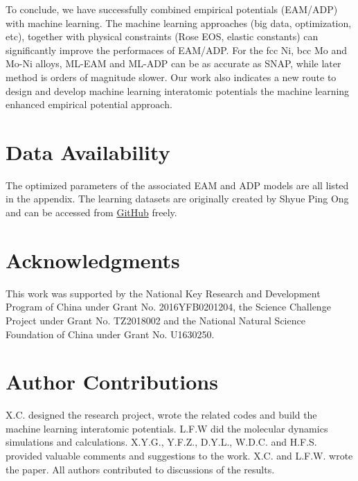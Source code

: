 \documentclass[prb,reprint,superscriptaddress]{revtex4-2}
\begin{document}
To conclude, we have successfully combined empirical potentials (EAM/ADP) with 
machine learning. The machine learning approaches (big data, optimization, etc), 
together with physical constraints (Rose EOS, elastic constants) can 
significantly improve the performaces of EAM/ADP. For the fcc Ni, bcc Mo and 
Mo-Ni alloys, ML-EAM and ML-ADP can be as accurate as SNAP, while later method 
is orders of magnitude slower. Our work also indicates a new route to design and 
develop machine learning interatomic potentials \textemdash the machine learning 
enhanced empirical potential approach.

% 
%
\section*{Data Availability}
The optimized parameters of the associated EAM and ADP models are all listed in 
the appendix. The learning datasets are originally created by Shyue Ping Ong 
and can be accessed from 
\href{https://github.com/materialsvirtuallab/snap}{GitHub} freely.

% 
%
\section*{Acknowledgments}
\label{sec:acknowledgments}

This work was supported by the National Key Research and Development Program of 
China under Grant No. 2016YFB0201204, the Science Challenge Project under Grant 
No. TZ2018002 and the National Natural Science Foundation of China under Grant 
No. U1630250.

% 
%
\section*{Author Contributions}
X.C. designed the research project, wrote the related codes and build the 
machine learning interatomic potentials. L.F.W did the molecular dynamics 
simulations and calculations. X.Y.G., Y.F.Z., D.Y.L., W.D.C. and H.F.S. provided 
valuable comments and suggestions to the work. X.C. and L.F.W. wrote the paper. 
All authors contributed to discussions of the results.
\end{document}
